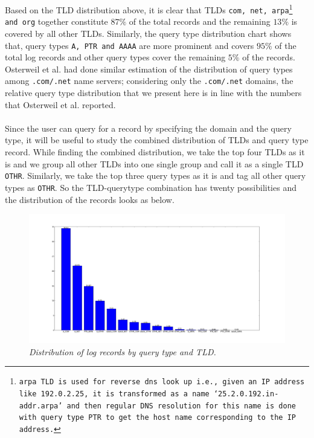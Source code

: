 \documentclass[11pt,a4paper]{article}
\begin{document}
\noindent
Based on the TLD distribution above, it is clear that TLDs \texttt{com, net, arpa\footnote{arpa TLD is used for reverse dns look up i.e., given an IP address like 192.0.2.25, it is transformed as a name `25.2.0.192.in-addr.arpa' and then regular DNS resolution for this name is done with query type PTR to get the host name corresponding to the IP address.} and org} together constitute $87\%$ of the total records and the remaining $13\%$ is covered by all other TLDs. Similarly, the query type distribution chart shows that, query types \texttt{A, PTR and AAAA} are more prominent and covers $95\%$ of the total log records and other query types cover the remaining $5\%$ of the records. Osterweil et al.\cite{toptalker} had done similar estimation of the distribution of query types among \texttt{.com/.net} name servers; considering only the \texttt{.com/.net} domains, the relative query type distribution that we present here is in line with the numbers that Osterweil et al. reported.
\\\\
Since the user can query for a record by specifying the domain and the query type, it will be useful to study the combined distribution of TLDs and query type record. While finding the combined distribution, we take the top four TLDs as it is and we group all other TLDs into one single group and call it as a single TLD \texttt{OTHR}. Similarly, we take the top three query types as it is and tag all other query types as \texttt{OTHR}. So the TLD-querytype combination has twenty possibilities and the distribution of the records looks as below.

\begin{figure}[H] 
\centering
\includegraphics[width=1\textwidth]{./data/RESULTS/graphs/qtype_tld_dist.png}
\caption {\textit{Distribution of log records by query type and TLD.}}
\end{figure}
\end{document}
